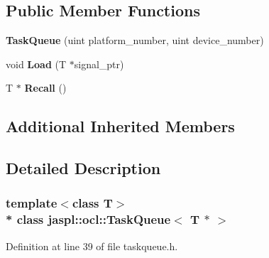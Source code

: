 \subsection*{Public Member Functions}
\begin{DoxyCompactItemize}
\item 
{\bfseries Task\+Queue} (uint platform\+\_\+number, uint device\+\_\+number)\hypertarget{classjaspl_1_1ocl_1_1_task_queue_3_01_t_01_5_01_4_a79fad9fbd8502d2ad4fbc3bc72beb025}{}\label{classjaspl_1_1ocl_1_1_task_queue_3_01_t_01_5_01_4_a79fad9fbd8502d2ad4fbc3bc72beb025}

\item 
void {\bfseries Load} (T $\ast$signal\+\_\+ptr)\hypertarget{classjaspl_1_1ocl_1_1_task_queue_3_01_t_01_5_01_4_a551e195b02111e01482ef4a2783f5f1c}{}\label{classjaspl_1_1ocl_1_1_task_queue_3_01_t_01_5_01_4_a551e195b02111e01482ef4a2783f5f1c}

\item 
T $\ast$ {\bfseries Recall} ()\hypertarget{classjaspl_1_1ocl_1_1_task_queue_3_01_t_01_5_01_4_ab70f0e28df3b5b5217804a86d8f63994}{}\label{classjaspl_1_1ocl_1_1_task_queue_3_01_t_01_5_01_4_ab70f0e28df3b5b5217804a86d8f63994}

\end{DoxyCompactItemize}
\subsection*{Additional Inherited Members}


\subsection{Detailed Description}
\subsubsection*{template$<$class T$>$\\*
class jaspl\+::ocl\+::\+Task\+Queue$<$ T $\ast$ $>$}



Definition at line 39 of file taskqueue.\+h.

